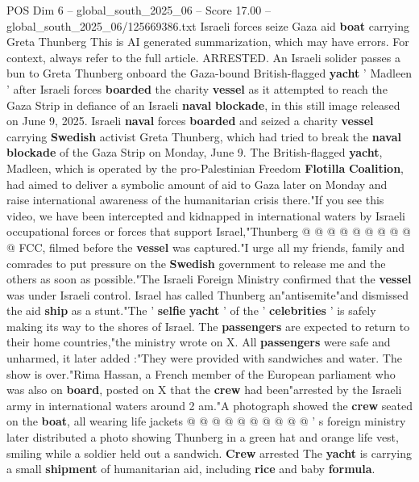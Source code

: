 \begin{textsample}{POS Dim 6 – global\_south\_2025\_06 – Score 17.00 – global\_south\_2025\_06/125669386.txt}  \label{ex:f6_pos_004}
Israeli forces seize Gaza aid \textbf{boat} carrying Greta Thunberg This is AI generated summarization, which may have errors.
For context, always refer to the full article.
ARRESTED.
An Israeli solider passes a bun to Greta Thunberg onboard the Gaza-bound British-flagged \textbf{yacht} ' Madleen ' after Israeli forces \textbf{boarded} the charity \textbf{vessel} as it attempted to reach the Gaza Strip in defiance of an Israeli \textbf{naval} \textbf{blockade}, in this still image released on June 9, 2025.
Israeli \textbf{naval} forces \textbf{boarded} and seized a charity \textbf{vessel} carrying \textbf{Swedish} activist Greta Thunberg, which had tried to break the \textbf{naval} \textbf{blockade} of the Gaza Strip on Monday, June 9.
The British-flagged \textbf{yacht}, Madleen, which is operated by the pro-Palestinian Freedom \textbf{Flotilla} \textbf{Coalition}, had aimed to deliver a symbolic amount of aid to Gaza later on Monday and raise international awareness of the humanitarian crisis there."If you see this video, we have been intercepted and kidnapped in international waters by Israeli occupational forces or forces that support Israel,"Thunberg @ @ @ @ @ @ @ @ @ @ FCC, filmed before the \textbf{vessel} was captured."I urge all my friends, family and comrades to put pressure on the \textbf{Swedish} government to release me and the others as soon as possible."The Israeli Foreign Ministry confirmed that the \textbf{vessel} was under Israeli control.
Israel has called Thunberg an"antisemite"and dismissed the aid \textbf{ship} as a stunt."The ' \textbf{selfie} \textbf{yacht} ' of the ' \textbf{celebrities} ' is safely making its way to the shores of Israel.
The \textbf{passengers} are expected to return to their home countries,"the ministry wrote on X.
All \textbf{passengers} were safe and unharmed, it later added :"They were provided with sandwiches and water.
The show is over."Rima Hassan, a French member of the European parliament who was also on \textbf{board}, posted on X that the \textbf{crew} had been"arrested by the Israeli army in international waters around 2 am."A photograph showed the \textbf{crew} seated on the \textbf{boat}, all wearing life jackets @ @ @ @ @ @ @ @ @ @ ' s foreign ministry later distributed a photo showing Thunberg in a green hat and orange life vest, smiling while a soldier held out a sandwich. \textbf{Crew} arrested The \textbf{yacht} is carrying a small \textbf{shipment} of humanitarian aid, including \textbf{rice} and baby \textbf{formula}.

\end{textsample}

